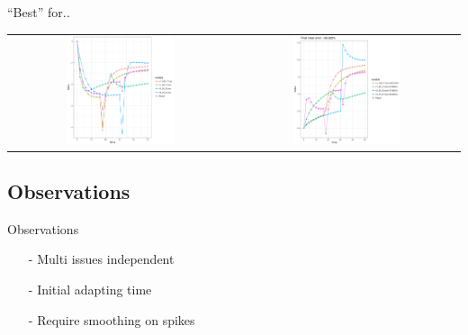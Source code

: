 \documentclass{beamer}
\def\itemizespace{\vspace{7mm}}
\begin{document}
\begin{frame}{``Best'' for..}
	\begin{table}
		\begin{tabular}{ cc }
			\includegraphics[width=0.5\textwidth]{multi_4_correction.png} &
			\includegraphics[width=0.5\textwidth]{multi_4_result.png} \\
		\end{tabular}
	\end{table}
\end{frame}

\subsection{Observations}
\begin{frame}{Observations}
	\begin{itemize}[<+->]
		\item[-] Multi issues independent
		\itemizespace%

		\item[-] Initial adapting time
		\itemizespace%

		\item[-] Require smoothing on spikes

	\end{itemize}
\end{frame}
\end{document}
